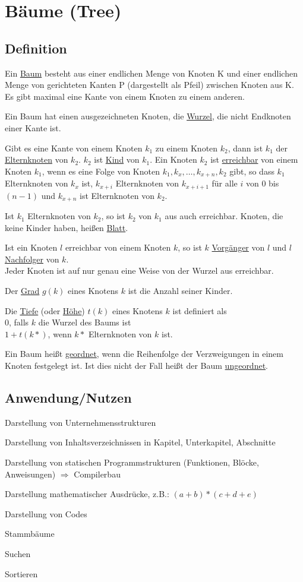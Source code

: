 \section{Bäume (Tree)}
\subsection{Definition}
Ein \ul{Baum} besteht aus einer endlichen Menge von Knoten K und einer endlichen Menge von gerichteten Kanten P (dargestellt als Pfeil) zwischen Knoten aus K. Es gibt maximal eine Kante von einem Knoten zu einem anderen.

Ein Baum hat einen ausgezeichneten Knoten, die \ul{Wurzel}, die nicht Endknoten einer Kante ist.

Gibt es eine Kante von einem Knoten $k_1$ zu einem Knoten $k_2$, dann ist $k_1$ der \ul{Elternknoten} von $k_2$. $k_2$ ist \ul{Kind} von $k_1$. Ein Knoten $k_2$ ist \ul{erreichbar} von einem Knoten $k_1$, wenn es eine Folge von Knoten $k_1, k_x, \ldots, k_{x+n}, k_2$ gibt, so dass $k_1$ Elternknoten von $k_x$ ist, $k_{x+i}$ Elternknoten von $k_{x+i+1}$ für alle $i$ von $0$ bis $(n-1)$ und $k_{x+n}$ ist Elternknoten von $k_2$.

Ist $k_1$ Elternknoten von $k_2$, so ist $k_2$ von $k_1$ aus auch erreichbar. Knoten, die keine Kinder haben, heißen \ul{Blatt}.

Ist ein Knoten $l$ erreichbar von einem Knoten $k$, so ist $k$ \ul{Vorgänger} von $l$ und $l$ \ul{Nachfolger} von $k$.\\
Jeder Knoten ist auf nur genau eine Weise von der Wurzel aus erreichbar.

Der \ul{Grad} $g(k)$ eines Knotens $k$ ist die Anzahl seiner Kinder.

Die \ul{Tiefe} (oder \ul{Höhe}) $t(k)$ eines Knotens $k$ ist definiert als\\
$0$, falls $k$ die Wurzel des Baums ist\\
$1 + t(k*)$, wenn $k*$ Elternknoten von $k$ ist.

Ein Baum heißt \ul{geordnet}, wenn die Reihenfolge der Verzweigungen in einem Knoten festgelegt ist. Ist dies nicht der Fall heißt der Baum \ul{ungeordnet}.

\subsection{Anwendung/Nutzen}
\begin{compactitem}
	\item Darstellung von Unternehmensstrukturen
	\item Darstellung von Inhaltsverzeichnissen in Kapitel, Unterkapitel, Abschnitte
	\item Darstellung von statischen Programmstrukturen (Funktionen, Blöcke, Anweisungen) $\Rightarrow$ Compilerbau
	\item Darstellung mathematischer Ausdrücke, z.B.: $(a+b)*(c+d+e)$
	\item Darstellung von Codes
	\item Stammbäume
	\item Suchen
	\item Sortieren
\end{compactitem}

